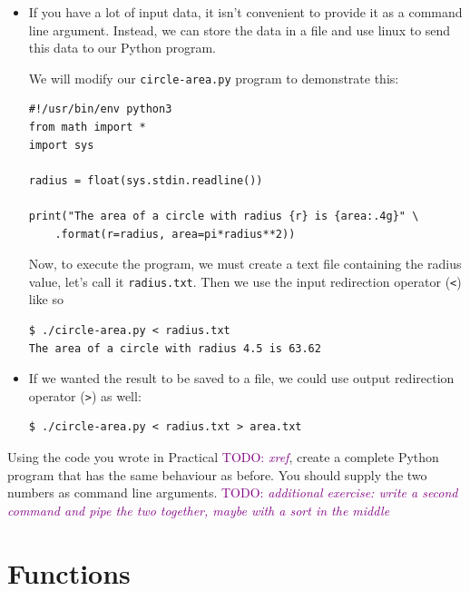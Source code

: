 \documentclass[a4paper,twoside]{memoir}
\makeatletter
\newcommand{\FrameTitle}[2]{%
  \fboxrule=\FrameRule \fboxsep=\FrameSep
  \fbox{\vbox{\nobreak \vskip -0.7\FrameSep
    \rlap{\centerline{\strut#1}}\nobreak\nointerlineskip%
    \vskip 0.7\FrameSep
    \hbox{#2}}}}
\newenvironment{framewithtitle}[2][\FrameFirst@Lab\ (cont.)]{%
  \def\FrameFirst@Lab{\textbf{#2}}%
  \def\FrameCont@Lab{\textbf{#1}}%
  \def\FrameCommand##1{%
    \FrameTitle{\FrameFirst@Lab}{##1}}%
  \def\FirstFrameCommand##1{%
    \FrameTitle{\FrameFirst@Lab}{##1}}%
  \def\MidFrameCommand##1{%
    \FrameTitle{\FrameCont@Lab}{##1}}%
  \def\LastFrameCommand##1{%
    \FrameTitle{\FrameCont@Lab}{##1}}%
\MakeFramed{\advance\hsize-\width \FrameRestore}}%
{\endMakeFramed}
\newcounter{exercisectr}
\newenvironment{exercise}
{\stepcounter{exercisectr}\begin{framewithtitle}{Practical \arabic{exercisectr}}}
{\end{framewithtitle}}
\newcommand{\shellcmd}{\texttt}
\newcommand{\TODO}[1]{\textcolor{purple}{TODO: \emph{#1}}}
\makeatother
\begin{document}
\begin{itemize}
\begin{verbatim}
radius = float(sys.argv[1])

print("The area of a circle with radius {r} is {area:.4g}" \
	.format(r=radius, area=pi*radius**2))
\end{verbatim}
Now we can execute the program like this:
\begin{verbatim}
$ ./circle-area.py 4.5
The area of a circle with radius 4.5 is 63.62
\end{verbatim}
The \shellcmd{argv} variable is an array of strings.  We will describe arrays later in section~\TODO{xref}.

\item If you have a lot of input data, it isn't convenient to provide it as a command line argument.  Instead, we can store the data in a file and use linux to send this data to our Python program.

We will modify our \shellcmd{circle-area.py} program to demonstrate this:
\begin{verbatim}
#!/usr/bin/env python3
from math import *
import sys

radius = float(sys.stdin.readline())

print("The area of a circle with radius {r} is {area:.4g}" \
	.format(r=radius, area=pi*radius**2))
\end{verbatim}
Now, to execute the program, we must create a text file containing the radius value, let's call it \shellcmd{radius.txt}.  Then we use the input redirection operator (\shellcmd{<}) like so
\begin{verbatim}
$ ./circle-area.py < radius.txt
The area of a circle with radius 4.5 is 63.62
\end{verbatim}
\item If we wanted the result to be saved to a file, we could use output redirection operator (\shellcmd{>}) as well:
\begin{verbatim}
$ ./circle-area.py < radius.txt > area.txt
\end{verbatim}
\end{itemize}

\begin{exercise}
Using the code you wrote in Practical \TODO{xref}, create a complete Python program that has the same behaviour as before.  You should supply the two numbers as command line arguments.
	\TODO{additional exercise: write a second command and pipe the two together, maybe with a sort in the middle}
\end{exercise}

\section{Functions}
\end{document}
